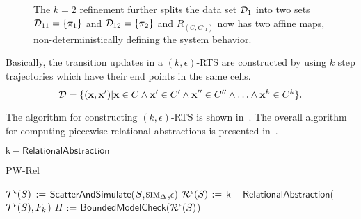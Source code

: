 \begin{figure}[!htbp]
\begin{center}
\begin{tikzpicture}
\end{tikzpicture}
\end{center}
\vspace*{-.3cm}
\caption{The $k=2$ refinement further splits the data set $\ds_1$
    into two sets $\ds_{11} = \setof{\pi_1}$ and $\ds_{12} =
    \setof{\pi_2}$ and $R_{(C,C'_1)}$ now has two affine maps,
    non-deterministically defining the system behavior.}
\label{fig:k2}
\vspace*{-.3cm}
\end{figure}


Basically, the transition updates in a $(k,\epsilon)$-RTS are
constructed by using $k$ step trajectories which have their end points
in the same cells.
\[
    \ds = \setof{(\vx,\vx') | \vx \in C \land \vx' \in C' \land \vx''
    \in C'' \land \ldots \land \vx^k \in C^k }.
\]


The algorithm for constructing $(k,\epsilon)$-RTS is shown
in~. The overall algorithm for computing piecewise
relational abstractions is presented in~.

\begin{algorithm}[t]
\DontPrintSemicolon
    \caption{$\mathsf{k-RelationalAbstraction}$\label{algo:krelabs}}
    \KwOut{$\RTSAbstraction{\epsilon}{\System}$}
\end{algorithm}




\begin{algorithm}[t]
\DontPrintSemicolon
\caption{PW-Rel\label{algo:pwa-rel}}
    $\TSAbstraction{\epsilon}{\System}$ $\assign$ $\mathsf{ScatterAndSimulate}$($\System$,$\simmap_\Delta$,$\epsilon$)  \;
    $\RTSAbstraction{\epsilon}{\System}$ $\assign$
    $\mathsf{k-RelationalAbstraction}$($\TSAbstraction{\epsilon}{\System}, F_k$)  \;
    $\Pi$ $\assign$ $\mathsf{BoundedModelCheck}$($\RTSAbstraction{\epsilon}{\System}$)  \;
\end{algorithm}
